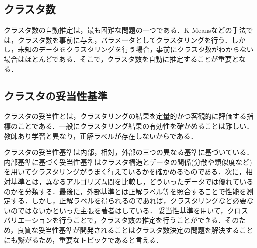 \documentclass[10pt,onecolumn]{jsarticle}
\begin{document}
\subsection{クラスタ数}
クラスタ数の自動推定は，最も困難な問題の一つである．K-Meansなどの手法では，クラスタ数を事前に与え，パラメータとしてクラスタリングを行う．しかし，未知のデータをクラスタリングを行う場合，事前にクラスタ数がわからない場合はほとんどである．そこで，クラスタ数を自動に推定することが重要となる．
\subsection{クラスタの妥当性基準}
クラスタの妥当性とは，クラスタリングの結果を定量的かつ客観的に評価する指標のことである．一般にクラスタリング結果の有効性を確かめることは難しい．教師あり学習と異なり，正解ラベルが存在しないからである．

クラスタの妥当性基準は内部，相対，外部の三つの異なる基準に基づいている．内部基準に基づく妥当性基準はクラスタ構造とデータの関係(分散や類似度など)を用いてクラスタリングがうまく行えているかを確かめるものである．次に，相対基準とは，異なるアルゴリズム間を比較し，どういったデータでは優れているのかを分類する．最後に，外部基準とは正解ラベル等を照合することで性能を測定する．しかし，正解ラベルを得られるのであれば，クラスタリングなど必要ないのではないかといった主張を著者はしている．
妥当性基準を用いて，クロスバリエーションを行うことで，クラスタ数の推定を行うことができる．そのため，良質な妥当性基準が開発されることはクラスタ数決定の問題を解決することにも繋がるため，重要なトピックであると言える．


\end{document}
